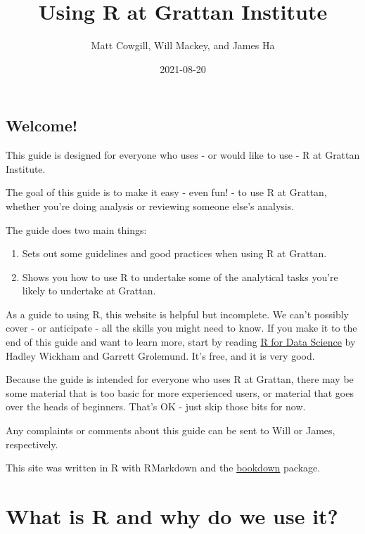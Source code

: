 \documentclass[
]{book}
\title{Using R at Grattan Institute}
\author{Matt Cowgill, Will Mackey, and James Ha}
\date{2021-08-20}
\providecommand{\tightlist}{%
  \setlength{\itemsep}{0pt}\setlength{\parskip}{0pt}}
\begin{document}
\maketitle

{
\setcounter{tocdepth}{1}
\tableofcontents
}
\hypertarget{welcome}{%
\chapter*{Welcome!}\label{welcome}}

This guide is designed for everyone who uses - or would like to use - R at Grattan Institute.

The goal of this guide is to make it easy - even fun! - to use R at Grattan, whether you're doing analysis or reviewing someone else's analysis.

The guide does two main things:

\begin{enumerate}
\def\labelenumi{\arabic{enumi}.}
\tightlist
\item
  Sets out some guidelines and good practices when using R at Grattan.
\item
  Shows you how to use R to undertake some of the analytical tasks you're likely to undertake at Grattan.
\end{enumerate}

As a guide to using R, this website is helpful but incomplete. We can't possibly cover - or anticipate - all the skills you might need to know. If you make it to the end of this guide and want to learn more, start by reading \href{https://r4ds.had.co.nz}{R for Data Science} by Hadley Wickham and Garrett Grolemund. It's free, and it is very good.

Because the guide is intended for everyone who uses R at Grattan, there may be some material that is too basic for more experienced users, or material that goes over the heads of beginners. That's OK - just skip those bits for now.

Any complaints or comments about this guide can be sent to Will or James, respectively.

This site was written in R with RMarkdown and the \href{https://bookdown.org}{bookdown} package.

\hypertarget{part-what-is-r-and-why-do-we-use-it}{%
\part{What is R and why do we use it?}\label{part-what-is-r-and-why-do-we-use-it}}
\end{document}
